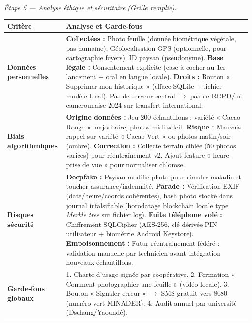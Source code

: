 \documentclass[11pt]{article}
\begin{document}
\begin{exoresolu}
\emph{Étape 5 — Analyse éthique et sécuritaire (Grille remplie).}
\begin{center}
\begin{tabularx}{\linewidth}{|l|X|}\hline
\textbf{Critère} & \textbf{Analyse et Garde-fous} \\\hline
\textbf{Données personnelles} & \textbf{Collectées :} Photo feuille (donnée biométrique végétale, pas humaine), Géolocalisation GPS (optionnelle, pour cartographie foyers), ID paysan (pseudonyme). \textbf{Base légale :} Consentement explicite (case à cocher au 1er lancement + oral en langue locale). \textbf{Droits :} Bouton « Supprimer mon historique » (efface SQLite + fichier modèle local). Pas de serveur central $\rightarrow$ pas de RGPD/loi camerounaise 2024 sur transfert international. \\\hline
\textbf{Biais algorithmiques} & \textbf{Origine données :} Jeu 200 échantillons : variété « Cacao Rouge » majoritaire, photos midi soleil. \textbf{Risque :} Mauvais rappel sur variété « Cacao Vert » ou photos matin/soir (ombre). \textbf{Correction :} Collecte terrain ciblée (50 photos variées) pour réentraînement v2. Ajout feature « heure prise de vue » pour normaliser chlorose. \\\hline
\textbf{Risques sécurité} & \textbf{Deepfake :} Paysan modifie photo pour simuler maladie et toucher assurance/indemnité. \textbf{Parade :} Vérification EXIF (date/heure/coords cohérentes), hash photo stocké dans journal infalsifiable (horodatage blockchain locale type \emph{Merkle tree} sur fichier log). \textbf{Fuite téléphone volé :} Chiffrement SQLCipher (AES-256, clé dérivée PIN utilisateur + biométrie Android Keystore). \textbf{Empoisonnement :} Futur réentraînement fédéré : validation manuelle par technicien avant intégration nouveaux échantillons. \\\hline
\textbf{Garde-fous globaux} & 1. Charte d'usage signée par coopérative. 2. Formation « Comment photographier une feuille » (vidéo locale). 3. Bouton « Signaler erreur » $\rightarrow$ SMS gratuit vers 8080 (numéro vert MINADER). 4. Audit annuel par université (Dschang/Yaoundé). \\\hline
\end{tabularx}
\end{center}


\end{exoresolu}
\end{document}
